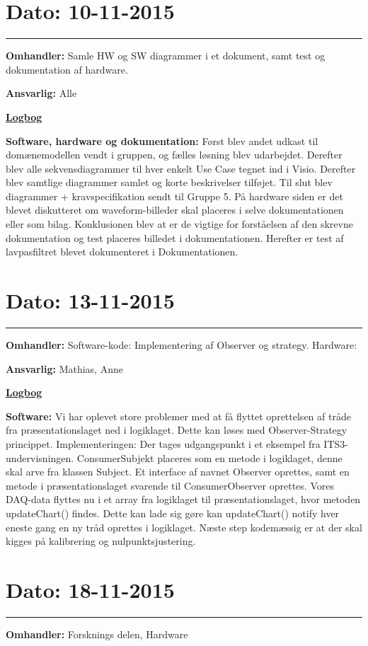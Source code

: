 \section{Dato: 10-11-2015}
\hrule
\textbf{Omhandler:} Samle HW og SW diagrammer i et dokument, samt test og dokumentation af hardware.

\textbf{Ansvarlig:} Alle

\underline{\textbf{Logbog}}

\textbf{Software, hardware og dokumentation: }Først blev andet udkast til domænemodellen vendt i gruppen, og fælles løsning blev udarbejdet. Derefter blev alle sekvensdiagrammer til hver enkelt Use Case tegnet ind i Visio. Derefter blev samtlige diagrammer samlet og korte beskrivelser tilføjet. Til slut blev diagrammer + kravspecifikation sendt til Gruppe 5. 
På hardware siden er det blevet diskutteret om waveform-billeder skal placeres i selve dokumentationen eller som bilag. Konklusionen blev at er de vigtige for forståelsen af den skrevne dokumentation og test placeres billedet i dokumentationen. Herefter er test af lavpasfiltret blevet dokumenteret i Dokumentationen.

\section{Dato: 13-11-2015}
\hrule
\textbf{Omhandler:} Software-kode: Implementering af Observer og strategy. Hardware:  

\textbf{Ansvarlig:} Mathias, Anne

\underline{\textbf{Logbog}}

\textbf{Software: }Vi har oplevet store problemer med at få flyttet oprettelsen af tråde fra præsentationslaget ned i logiklaget. Dette kan løses med Observer-Strategy princippet. 
Implementeringen: Der tages udgangspunkt i et eksempel fra ITS3-undervisningen. ConsumerSubjekt placeres som en metode i logiklaget, denne skal arve fra klassen Subject. Et interface af navnet Observer oprettes, samt en metode i præsentationslaget svarende til ConsumerObserver oprettes. Vores DAQ-data flyttes nu i et array fra logiklaget til præsentationslaget, hvor metoden updateChart() findes. Dette kan lade sig gøre kan updateChart() notify hver eneste gang en ny tråd oprettes i logiklaget. 
Næste step kodemæssig er at der skal kigges på kalibrering og nulpunktsjustering.

\section{Dato: 18-11-2015}
\hrule
\textbf{Omhandler:} Forsknings delen, Hardware

